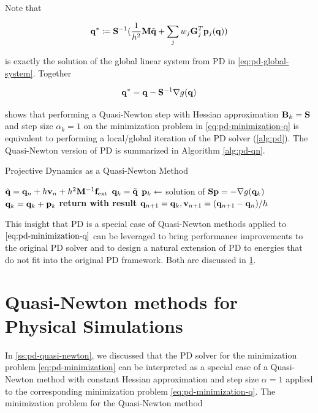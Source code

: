\noindent Note that 

\[
    \mathbf{q}^* \coloneqq \mathbf{S}^{-1} (\frac{1}{h^2}\mathbf{M}\tilde{\mathbf{q}} + \sum_j w_j 
    \mathbf{G}_j^T \mathbf{p}_j(\mathbf{q}))
\]

\noindent is exactly the solution of the global linear system from PD in \autoref{eq:pd-global-system}. Together

\[
    \mathbf{q}^* = \mathbf{q} -\mathbf{S}^{-1} \nabla g(\mathbf{q}) 
\]

\noindent shows that performing a Quasi-Newton step with Hessian approximation $\mathbf{B}_k = \mathbf{S}$ and step size 
$\alpha_k = 1$ on the 
minimization problem in \autoref{eq:pd-minimization-q} is equivalent to performing a local/global iteration of the PD solver 
(\cref{alg:pd}). The Quasi-Newton version of PD is summarized in Algorithm \ref{alg:pd-qn}.

\begin{algorithm}
\caption{Projective Dynamics as a Quasi-Newton Method}\label{alg:pd-qn}
\begin{algorithmic}
\State $\tilde{\mathbf{q}} = \mathbf{q}_n + h\mathbf{v}_n + h^2\mathbf{M}^{-1}\mathbf{f}_{\text{ext}}$
\State $\mathbf{q}_k = \tilde{\mathbf{q}}$
\State $\mathbf{p}_k \gets$ solution of $\mathbf{S}\mathbf{p} = -\nabla g(\mathbf{q}_k)$
\State $\mathbf{q}_k = \mathbf{q}_k + \mathbf{p}_k$
\EndFor
\State \textbf{return with result } $\mathbf{q}_{n+1} = \mathbf{q}_k, \mathbf{v}_{n+1} = (\mathbf{q}_{n+1} - \mathbf{q}_n)/h$
\EndProcedure
\end{algorithmic}
\end{algorithm}

This insight that PD is a special case of Quasi-Newton methods applied to $\autoref{eq:pd-minimization-q}$ can be leveraged to
bring performance improvements to the original PD solver and to design a natural extension of PD to energies that do not fit 
into the original PD framework. Both are discussed in \cref{s:qn-rts}.

\section{Quasi-Newton methods for Physical Simulations}\label{s:qn-rts}
In \cref{ss:pd-quasi-newton}, we discussed that the PD solver for the minimization problem \autoref{eq:pd-minimization}
can be interpreted as a special case of a Quasi-Newton method with constant Hessian approximation and step size $\alpha = 1$
applied to the corresponding minimization problem \autoref{eq:pd-minimization-q}. The minimization problem for the Quasi-Newton
method


